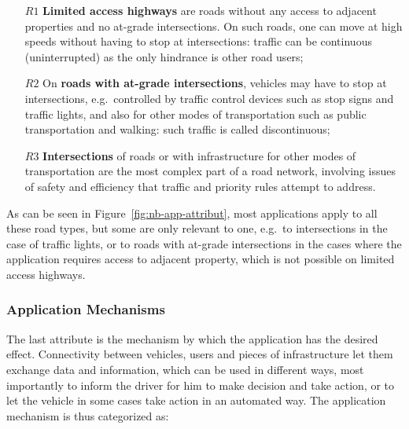\begin{enumerate}
\item[$R1$] {\bf Limited access highways} are roads without any access to adjacent properties and no at-grade intersections. On such roads, one can move at high speeds without having to stop at intersections: traffic can be continuous (uninterrupted) as the only hindrance is other road users;%
\item[$R2$] On {\bf roads with at-grade intersections}, vehicles may have to stop at intersections, e.g.\ controlled by traffic control devices such as stop signs and traffic lights, and also for other modes of transportation such as public transportation and walking: such traffic is called discontinuous;
\item[$R3$] {\bf Intersections} of roads or with infrastructure for other modes of transportation are the most complex part of a road network, involving issues of safety and efficiency that traffic and priority rules attempt to address. %
\end{enumerate}

As can be seen in Figure~\ref{fig:nb-app-attribut}, most applications apply to all these road types, but some are only relevant to one, e.g.\ to intersections in the case of traffic lights, or to roads with at-grade intersections in the cases where the application requires access to adjacent property, which is not possible on limited access highways. 


\subsubsection{Application Mechanisms}
The last attribute is the mechanism by which the application has the desired effect. Connectivity between vehicles, users and pieces of infrastructure let them exchange data and information, which can be used in different ways, most importantly to inform the driver for him to make decision and take action, or to let the vehicle in some cases take action in an automated way. The application mechanism is thus categorized as:


